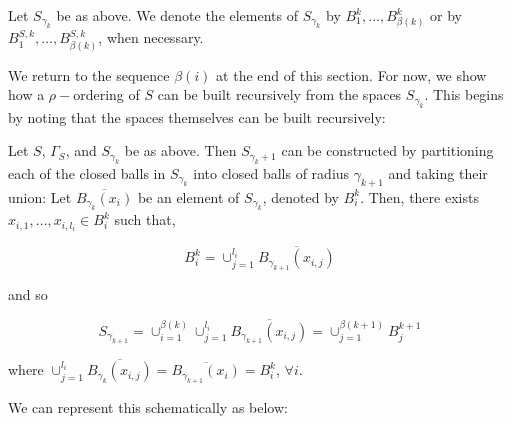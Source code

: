 \begin{notation*}
Let $S_{\gamma_k}$ be as above. We denote the elements of $S_{\gamma_k}$ by $B^k_1, \ldots, B^k_{\beta(k)}$ or by $B^{S,k}_1, \ldots, B^{S,k}_{\beta(k)}$, when necessary.
\end{notation*}


We return to the sequence $\beta(i)$ at the end of this section. For now, we show how a $\rho-$ordering of $S$ can be built recursively from the spaces $S_{\gamma_k}$. This begins by noting that the spaces themselves can be built recursively:

\begin{observation*}
Let $S$, $\Gamma_S$, and $S_{\gamma_k}$ be as above. Then $S_{\gamma_k+1}$ can be constructed by partitioning each of the closed balls in $S_{\gamma_k}$ into closed balls of radius $\gamma_{k+1}$ and taking their union:  Let $\overline{B_{\gamma_k}(x_i)}$  be an element of $S_{\gamma_k}$, denoted by  $B^k_i$. Then, there exists $x_{i,1},\ldots, x_{i,l_{i}} \in B^k_i$ such that,

\[B^k_i=  \cup_{j=1}^{l_i} \overline{B_{\gamma_{k+1}}(x_{i,j})}\] 

and so

\[S_{\gamma_{k+1}} =  \cup_{i=1}^{\beta(k)}   \cup_{j=1}^{l_i} \overline{B_{\gamma_{k+1}}(x_{i,j})} = \cup^{\beta(k+1)}_{j=1}B^{k+1}_{j}\] 


where $\cup_{j=1}^{l_i} \overline{B_{\gamma_k}(x_{i,j})}=\overline{B_{\gamma_{k+1}}(x_i)} = B^k_i$, $\forall i$.
\end{observation*}

We can represent this schematically as below:\\
\tikzset{font=\small,
level distance=1.75cm,
}



